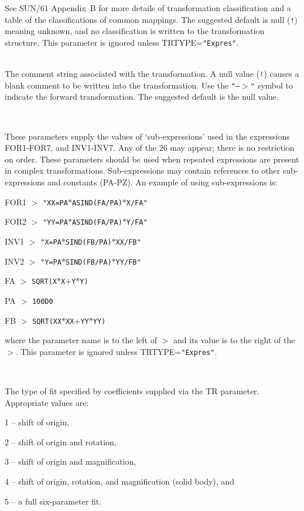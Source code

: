 \documentclass[twoside,11pt]{article}
\newcommand{\sstsubsection}[1]{ \item[{#1}] \mbox{} \\}
\newcommand{\sstsubsection}[1]{\item[{#1}]}
\begin{document}
{{{         See SUN/61 Appendix~B for more details of transformation
         classification and a table of the classifications of common
         mappings.  The suggested default is null ({\tt !}) meaning unknown,
         and no classification is written to the transformation
         structure.  This parameter is ignored unless TRTYPE={\tt "Expres"}.
      }
      \sstsubsection{
         COMMENT = LITERAL (Read)
      }{
         The comment string associated with the transformation.
         A null value ({\tt !}) causes a blank comment to be written into
         the transformation.  Use the {\tt "--$>$"} symbol to indicate the
         forward transformation.  The suggested default is the null value.
      }
      \sstsubsection{
         FA-FZ = LITERAL (Read)
      }{
         These parameters supply the values of `sub-expressions' used
         in the expressions FOR1-FOR7, and INV1-INV7.  Any of the 26
         may appear; there is no restriction on order.  These
         parameters should be used when repeated expressions are
         present in complex transformations.  Sub-expressions may
         contain references to other sub-expressions and constants
         (PA-PZ).  An example of using sub-expressions is:
         \begin{description}
         \item FOR1 $>$ {\tt "XX=PA$*$ASIND(FA/PA)$*$X/FA"}
         \item FOR2 $>$ {\tt "YY=PA$*$ASIND(FA/PA)$*$Y/FA"}
         \item INV1 $>$ {\tt "X=PA$*$SIND(FB/PA)$*$XX/FB"}
         \item INV2 $>$ {\tt "Y=PA$*$SIND(FB/PA)$*$YY/FB"}
         \item FA $>$ {\tt SQRT(X$*$X$+$Y$*$Y)}
         \item PA $>$ {\tt 100D0}
         \item FB $>$ {\tt SQRT(XX$*$XX$+$YY$*$YY)}
         \end{description}
         where the parameter name is to the left of $>$ and its value is
         to the right of the $>$.  This parameter is ignored unless
         TRTYPE={\tt "Expres"}.
      }
      \sstsubsection{
         FITTYPE = \_INTEGER (Read)
      }{
         The type of fit specified by coefficients supplied via the
         TR parameter.  Appropriate values are:
         \begin{description}
         \item 1 -- shift of origin,
         \item 2 -- shift of origin and rotation,
         \item 3 -- shift of origin and magnification,
         \item 4 -- shift of origin, rotation, and magnification
                   (solid body), and
         \item 5 -- a full six-parameter fit.
         \end{description}

}}}
\end{document}
